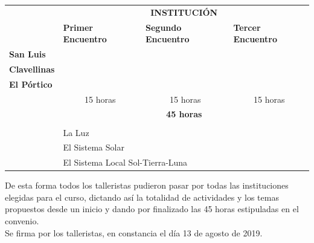 \documentclass[a4paper,10pt]{article}
\begin{document}
\begin{table}[H]
\centering
\begin{tabular}{llll}
\cline{2-4}
                         & \multicolumn{3}{c}{\textbf{INSTITUCIÓN}}                                                   \\ \cline{2-4} 
                         & \textbf{Primer Encuentro}    & \textbf{Segundo Encuentro}   & \textbf{Tercer Encuentro}    \\ \hline
\textbf{San Luis}        & \cellcolor[HTML]{FE0000}     & \cellcolor[HTML]{F8FF00}     & \cellcolor[HTML]{6665CD}     \\ \hline
\textbf{Clavellinas}     & \cellcolor[HTML]{FCFF2F}     & \cellcolor[HTML]{6665CD}     & \cellcolor[HTML]{FE0000}     \\ \hline
\textbf{El Pórtico}      & \cellcolor[HTML]{6665CD}     & \cellcolor[HTML]{FE0000}     & \cellcolor[HTML]{F8FF00}     \\ \hline
                         & \multicolumn{1}{c}{15 horas} & \multicolumn{1}{c}{15 horas} & \multicolumn{1}{c}{15 horas} \\ \cline{2-4} 
                         & \multicolumn{3}{c}{\textbf{45 horas}}                                                      \\
                         &                              &                              &                              \\
\cellcolor[HTML]{FE0000} & La Luz                       &                              &                              \\
\cellcolor[HTML]{F8FF00} & \multicolumn{3}{l}{El Sistema Solar}                                                       \\
\cellcolor[HTML]{6665CD} & \multicolumn{3}{l}{El Sistema Local Sol-Tierra-Luna}                                      
\end{tabular}
\end{table}


\noindent De esta forma todos los talleristas pudieron pasar por todas las instituciones elegidas para el curso, dictando así la totalidad de actividades y los temas propuestos desde un inicio y dando por finalizado las 45 horas estipuladas en el convenio.\\

\noindent Se firma por los talleristas, en constancia el día 13 de agosto de 2019.\\
\end{document}

